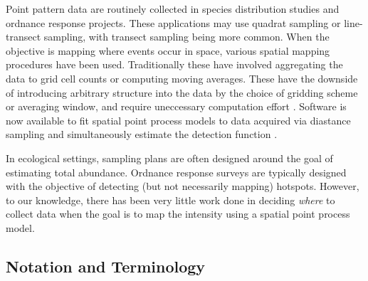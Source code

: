 \documentclass[review]{elsarticle}
\begin{document}
Point pattern data are routinely collected in species distribution studies and
ordnance response projects. These applications may use quadrat sampling or
line-transect sampling, with transect sampling being more common. When the
objective is mapping where events occur in space, various spatial mapping
procedures have been used. Traditionally these have involved aggregating the
data to grid cell counts or computing moving averages. These have the downside
of introducing arbitrary structure into the data by the choice of gridding
scheme or averaging window, and require uneccessary computation effort
\citep{simpsonetal}. Software is now available to fit spatial point process
models to data acquired via diastance sampling and simultaneously estimate the
detection function \citep{dspat}.

In ecological settings, sampling plans are often designed around the goal of
estimating total abundance. Ordnance response surveys are typically designed
with the objective of detecting (but not necessarily mapping) hotspots.
However, to our knowledge, there has been very little work done in deciding
\emph{where} to collect data when the goal is to map the intensity using a
spatial point process model.

\subsection{Notation and Terminology}
\end{document}
